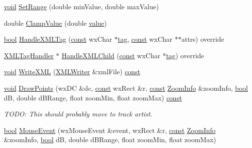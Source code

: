 \begin{DoxyCompactItemize}
\item 
\hyperlink{sound_8c_ae35f5844602719cf66324f4de2a658b3}{void} \hyperlink{class_envelope_aecfc3bd5b11d5b7a8eebdeedaab11e8e}{Set\+Range} (double min\+Value, double max\+Value)
\item 
double \hyperlink{class_envelope_a4a8e03849f2caa80641c7aabcbf36ee7}{Clamp\+Value} (double \hyperlink{lib_2expat_8h_a4a30a13b813682e68c5b689b45c65971}{value})
\item 
\hyperlink{mac_2config_2i386_2lib-src_2libsoxr_2soxr-config_8h_abb452686968e48b67397da5f97445f5b}{bool} \hyperlink{class_envelope_aa444e5a16c01d003f5abc83d2ad9d1fd}{Handle\+X\+M\+L\+Tag} (\hyperlink{getopt1_8c_a2c212835823e3c54a8ab6d95c652660e}{const} wx\+Char $\ast$\hyperlink{structtag}{tag}, \hyperlink{getopt1_8c_a2c212835823e3c54a8ab6d95c652660e}{const} wx\+Char $\ast$$\ast$attrs) override
\item 
\hyperlink{class_x_m_l_tag_handler}{X\+M\+L\+Tag\+Handler} $\ast$ \hyperlink{class_envelope_a2106f326d699adab9b44029782e9b1d9}{Handle\+X\+M\+L\+Child} (\hyperlink{getopt1_8c_a2c212835823e3c54a8ab6d95c652660e}{const} wx\+Char $\ast$\hyperlink{structtag}{tag}) override
\item 
\hyperlink{sound_8c_ae35f5844602719cf66324f4de2a658b3}{void} \hyperlink{class_envelope_a893b472ea27b24c980d6e5efcd5c5e55}{Write\+X\+ML} (\hyperlink{class_x_m_l_writer}{X\+M\+L\+Writer} \&xml\+File) \hyperlink{getopt1_8c_a2c212835823e3c54a8ab6d95c652660e}{const} 
\item 
\hyperlink{sound_8c_ae35f5844602719cf66324f4de2a658b3}{void} \hyperlink{class_envelope_a4463f20563902ef78367735ea25440f4}{Draw\+Points} (wx\+DC \&dc, \hyperlink{getopt1_8c_a2c212835823e3c54a8ab6d95c652660e}{const} wx\+Rect \&r, \hyperlink{getopt1_8c_a2c212835823e3c54a8ab6d95c652660e}{const} \hyperlink{class_zoom_info}{Zoom\+Info} \&zoom\+Info, \hyperlink{mac_2config_2i386_2lib-src_2libsoxr_2soxr-config_8h_abb452686968e48b67397da5f97445f5b}{bool} dB, double d\+B\+Range, float zoom\+Min, float zoom\+Max) \hyperlink{getopt1_8c_a2c212835823e3c54a8ab6d95c652660e}{const} 
\begin{DoxyCompactList}\small\item\em T\+O\+DO\+: This should probably move to track artist. \end{DoxyCompactList}\item 
\hyperlink{mac_2config_2i386_2lib-src_2libsoxr_2soxr-config_8h_abb452686968e48b67397da5f97445f5b}{bool} \hyperlink{class_envelope_a2f3f0bb42830e4116b493db3b86b9e51}{Mouse\+Event} (wx\+Mouse\+Event \&event, wx\+Rect \&r, \hyperlink{getopt1_8c_a2c212835823e3c54a8ab6d95c652660e}{const} \hyperlink{class_zoom_info}{Zoom\+Info} \&zoom\+Info, \hyperlink{mac_2config_2i386_2lib-src_2libsoxr_2soxr-config_8h_abb452686968e48b67397da5f97445f5b}{bool} dB, double d\+B\+Range, float zoom\+Min, float zoom\+Max)
$$
\end{DoxyCompactItemize}
